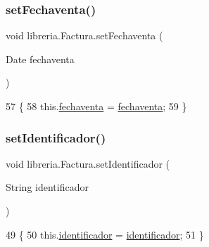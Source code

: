 \subsubsection{\texorpdfstring{set\+Fechaventa()}{setFechaventa()}}
{\footnotesize\ttfamily void libreria.\+Factura.\+set\+Fechaventa (\begin{DoxyParamCaption}\item[{Date}]{fechaventa }\end{DoxyParamCaption})\hspace{0.3cm}{\ttfamily [inline]}}


\begin{DoxyCode}
57                                                \{
58         this.\mbox{\hyperlink{classlibreria_1_1_factura_aac2c75df73a6156cca7c561448d1a783}{fechaventa}} = \mbox{\hyperlink{classlibreria_1_1_factura_aac2c75df73a6156cca7c561448d1a783}{fechaventa}};
59     \}
\end{DoxyCode}
\mbox{\label{classlibreria_1_1_factura_a11e37f56998779507063eaaade930564}} 
\subsubsection{\texorpdfstring{set\+Identificador()}{setIdentificador()}}
{\footnotesize\ttfamily void libreria.\+Factura.\+set\+Identificador (\begin{DoxyParamCaption}\item[{String}]{identificador }\end{DoxyParamCaption})\hspace{0.3cm}{\ttfamily [inline]}}


\begin{DoxyCode}
49                                                        \{
50         this.\mbox{\hyperlink{classlibreria_1_1_factura_a7bb7a8e9b6d2211ea69eed1db513a47b}{identificador}} = \mbox{\hyperlink{classlibreria_1_1_factura_a7bb7a8e9b6d2211ea69eed1db513a47b}{identificador}};
51     \}
\end{DoxyCode}
\mbox{\label{classlibreria_1_1_factura_ab90bbaf60897b82320034b2ba8df8d4f}} 

